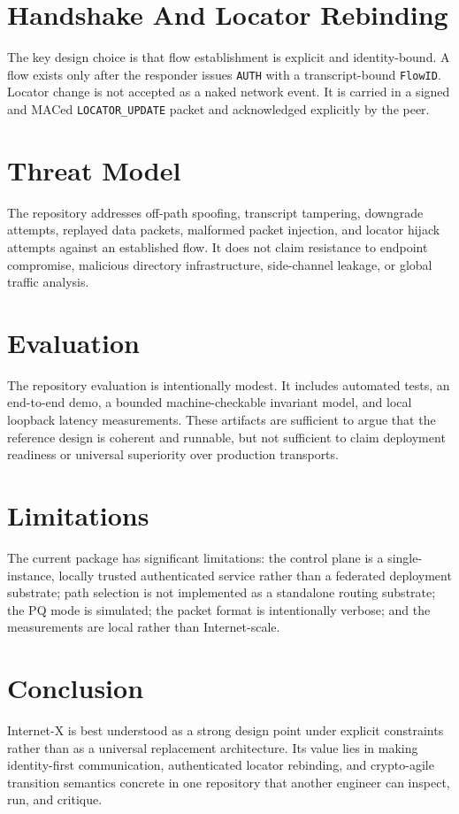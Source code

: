 \documentclass[11pt]{article}
\begin{document}
\section{Handshake And Locator Rebinding}
The key design choice is that flow establishment is explicit and identity-bound. A flow exists only after the responder issues \texttt{AUTH} with a transcript-bound \texttt{FlowID}. Locator change is not accepted as a naked network event. It is carried in a signed and MACed \texttt{LOCATOR\_UPDATE} packet and acknowledged explicitly by the peer.

\section{Threat Model}
The repository addresses off-path spoofing, transcript tampering, downgrade attempts, replayed data packets, malformed packet injection, and locator hijack attempts against an established flow. It does not claim resistance to endpoint compromise, malicious directory infrastructure, side-channel leakage, or global traffic analysis.

\section{Evaluation}
The repository evaluation is intentionally modest. It includes automated tests, an end-to-end demo, a bounded machine-checkable invariant model, and local loopback latency measurements. These artifacts are sufficient to argue that the reference design is coherent and runnable, but not sufficient to claim deployment readiness or universal superiority over production transports.

\section{Limitations}
The current package has significant limitations: the control plane is a single-instance, locally trusted authenticated service rather than a federated deployment substrate; path selection is not implemented as a standalone routing substrate; the PQ mode is simulated; the packet format is intentionally verbose; and the measurements are local rather than Internet-scale.

\section{Conclusion}
Internet-X is best understood as a strong design point under explicit constraints rather than as a universal replacement architecture. Its value lies in making identity-first communication, authenticated locator rebinding, and crypto-agile transition semantics concrete in one repository that another engineer can inspect, run, and critique.



\end{document}
